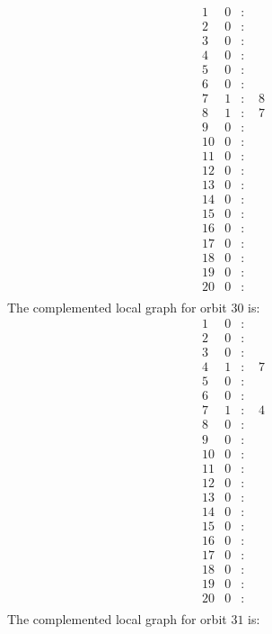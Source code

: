\documentclass[12pt]{article}
\begin{document}
\begin{equation*}
\begin{array}{rrcl}
1&0&:&\\
2&0&:&\\
3&0&:&\\
4&0&:&\\
5&0&:&\\
6&0&:&\\
7&1&:&\,\,8\\
8&1&:&\,\,7\\
9&0&:&\\
10&0&:&\\
11&0&:&\\
12&0&:&\\
13&0&:&\\
14&0&:&\\
15&0&:&\\
16&0&:&\\
17&0&:&\\
18&0&:&\\
19&0&:&\\
20&0&:&\\
\end{array}
\end{equation*}
The complemented local graph for orbit $30$ is:
\begin{equation*}
\begin{array}{rrcl}
1&0&:&\\
2&0&:&\\
3&0&:&\\
4&1&:&\,\,7\\
5&0&:&\\
6&0&:&\\
7&1&:&\,\,4\\
8&0&:&\\
9&0&:&\\
10&0&:&\\
11&0&:&\\
12&0&:&\\
13&0&:&\\
14&0&:&\\
15&0&:&\\
16&0&:&\\
17&0&:&\\
18&0&:&\\
19&0&:&\\
20&0&:&\\
\end{array}
\end{equation*}
The complemented local graph for orbit $31$ is:
\end{document}
